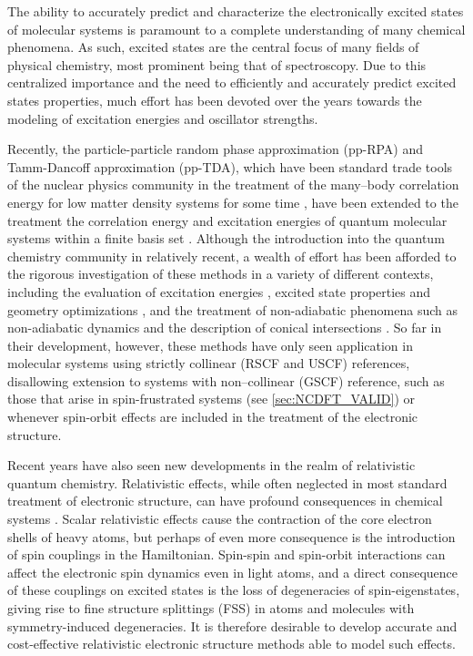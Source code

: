 The ability to accurately predict and characterize the electronically excited
states of molecular systems is paramount to a complete understanding of many
chemical phenomena. As such, excited states are the central focus of many
fields of physical chemistry, most prominent being that of spectroscopy. Due to
this centralized importance and the need to efficiently and accurately predict
excited states properties, much  effort has been devoted over the years towards
the modeling of excitation energies and oscillator strengths.


Recently, the particle-particle random phase approximation (pp-RPA) and 
Tamm-Dancoff approximation (pp-TDA), which have been standard trade tools of 
the nuclear physics community in the treatment of the many--body correlation energy for low matter density 
systems for some time \cite{SchuckBook_04}, 
have been extended to the treatment the correlation energy and excitation energies of quantum 
molecular systems within a finite basis set \cite{Yang13_224105,Yang13_18A522,
Yang13_174110,Yang13_104112,Yang13_030501,Yang09_066403,Bulik13_104113}.  Although the
introduction into the quantum chemistry community in relatively recent, a wealth 
of effort has been afforded to the rigorous investigation of these methods in a 
variety of different contexts, including the evaluation of excitation 
energies \cite{Yang13_224105,Yang13_18A522,Yang13_174110}, excited state properties 
and geometry optimizations \cite{Yang15_1025}, and the treatment of non-adiabatic 
phenomena such as non-adiabatic dynamics \cite{Liu14_244105} and the description 
of conical intersections \cite{Yang16_2407}.  So far in their development, however, 
these methods have only seen application in molecular systems using strictly 
collinear (RSCF and USCF) references, disallowing extension to systems with 
non--collinear (GSCF) reference, such as those that arise in spin-frustrated systems 
(see \cref{sec:NCDFT_VALID}) or whenever spin-orbit effects are included in the 
treatment of the electronic structure.


Recent years have also seen new developments in the realm of relativistic quantum 
chemistry.  Relativistic effects, while often neglected in most standard treatment
of electronic structure, can have profound consequences in chemical 
systems \cite{Pyykko12_45}.  Scalar relativistic effects cause the contraction of 
the core electron shells of heavy atoms, but perhaps of even more consequence is 
the introduction of spin couplings in the Hamiltonian.  Spin-spin and spin-orbit 
interactions can affect the electronic spin dynamics even in light atoms, and a 
direct consequence of these couplings on excited states is the loss of degeneracies
of spin-eigenstates, giving rise to fine structure splittings (FSS) in atoms and 
molecules with symmetry-induced degeneracies. It is therefore desirable to develop accurate and 
cost-effective relativistic electronic structure methods able to model such effects. 


